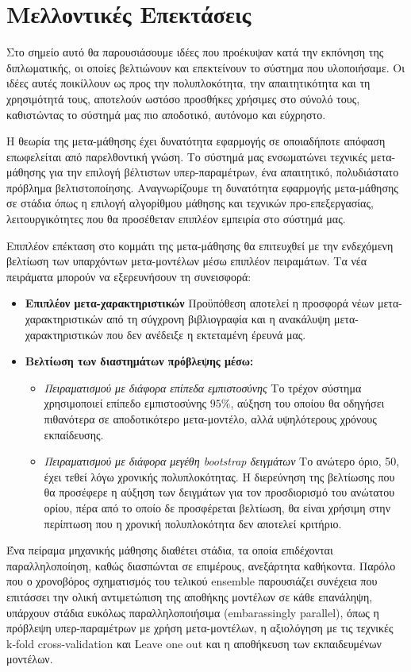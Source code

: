 \chapter{Μελλοντικές Επεκτάσεις}
Στο σημείο αυτό θα παρουσιάσουμε ιδέες που προέκυψαν κατά την εκπόνηση της διπλωματικής, οι οποίες βελτιώνουν και επεκτείνουν το σύστημα που υλοποιήσαμε. Οι ιδέες αυτές ποικίλλουν ως προς την πολυπλοκότητα, την απαιτητικότητα και τη χρησιμότητά τους, αποτελούν ωστόσο προσθήκες χρήσιμες στο σύνολό τους, καθιστώντας το σύστημά μας πιο αποδοτικό, αυτόνομο και εύχρηστο.

Η θεωρία της μετα-μάθησης έχει δυνατότητα εφαρμογής σε οποιαδήποτε απόφαση επωφελείται από παρελθοντική γνώση. Το σύστημά μας ενσωματώνει τεχνικές μετα-μάθησης για την επιλογή βέλτιστων υπερ-παραμέτρων, ένα απαιτητικό, πολυδιάστατο πρόβλημα βελτιστοποίησης. Αναγνωρίζουμε τη δυνατότητα εφαρμογής μετα-μάθησης σε στάδια όπως η επιλογή αλγορίθμου μάθησης και τεχνικών προ-επεξεργασίας, λειτουργικότητες που θα προσέθεταν επιπλέον εμπειρία στο σύστημά μας. 

Επιπλέον επέκταση στο κομμάτι της μετα-μάθησης θα επιτευχθεί με την ενδεχόμενη βελτίωση των υπαρχόντων μετα-μοντέλων μέσω επιπλέον πειραμάτων. Τα νέα πειράματα μπορούν να εξερευνήσουν τη συνεισφορά:
\begin{itemize}
	\item \textbf{Επιπλέον μετα-χαρακτηριστικών} Προϋπόθεση αποτελεί η προσφορά νέων μετα-χαρα\-κτηριστικών από τη σύγχρονη βιβλιογραφία και η ανακάλυψη μετα-χαρακτηριστικών που δεν ανέδειξε η εκτεταμένη έρευνά μας.
	\item \textbf{Βελτίωση των διαστημάτων πρόβλεψης μέσω:}
	\begin{itemize}
		\item \textit{Πειραματισμού με διάφορα επίπεδα εμπιστοσύνης} Το τρέχον σύστημα χρησιμοποιεί επίπεδο εμπιστοσύνης $95\%$, αύξηση του οποίου θα οδηγήσει πιθανότερα σε αποδοτικότερο μετα-μοντέλο, αλλά υψηλότερους χρόνους εκπαίδευσης.
		\item \textit{Πειραματισμού με διάφορα μεγέθη bootstrap δειγμάτων} Το ανώτερο όριο, 50, έχει τεθεί λόγω χρονικής πολυπλοκότητας. Η διερεύνηση της βελτίωσης που θα προσέφερε η αύξηση των δειγμάτων για τον προσδιορισμό του ανώτατου ορίου, πέρα από το οποίο δε προσφέρεται βελτίωση, θα είναι χρήσιμη στην περίπτωση που η χρονική πολυπλοκότητα δεν αποτελεί κριτήριο.
	\end{itemize} 
\end{itemize}

Ένα πείραμα μηχανικής μάθησης διαθέτει στάδια, τα οποία επιδέχονται παραλληλοποίηση, καθώς διασπώνται σε επιμέρους, ανεξάρτητα καθήκοντα. Παρόλο που ο χρονοβόρος σχηματισμός του τελικού ensemble παρουσιάζει συνέχεια που επιτάσσει την ολική αντιμετώπιση της αποθήκης μοντέλων σε κάθε επανάληψη, υπάρχουν στάδια ευκόλως παραλληλοποιήσιμα (embarassingly parallel), όπως η πρόβλεψη υπερ-παραμέτρων με χρήση μετα-μοντέλων, η αξιολόγηση με τις τεχνικές k-fold cross-validation και Leave one out και η αποθήκευση των εκπαιδευμένων μοντέλων.

